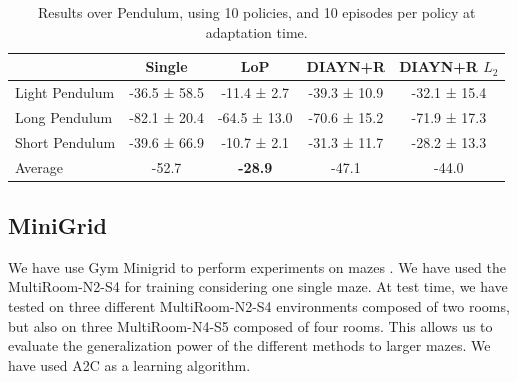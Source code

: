 \begin{table}[h!]
\begin{center}
    \begin{tabular}{l|c|c|c|c} \toprule
    &	Single	& LoP &	DIAYN+R& 	DIAYN+R $L_2$	\\ \hline
    
    Light Pendulum	&	-36.5 ± 58.5	& -11.4 ± 2.7	& -39.3 ± 10.9	& -32.1 ± 15.4	\\
Long Pendulum	&	-82.1 ± 20.4	& -64.5 ± 13.0	& -70.6 ± 15.2	& -71.9 ± 17.3	\\
Short Pendulum	&	-39.6 ± 66.9	& -10.7 ± 2.1	& -31.3 ± 11.7	& -28.2 ± 13.3	\\ \hline
Average	&	-52.7	& \textbf{-28.9}	& -47.1	& -44.0	\\
\hline
\end{tabular}
\caption{Results over Pendulum, using 10 policies, and 10 episodes per policy at adaptation time. }
\end{center}
\end{table}
\newpage
\subsection{MiniGrid}
\label{subsec:minigrid}

We have use Gym Minigrid to perform experiments on mazes \cite{gym_minigrid}. We have used the MultiRoom-N2-S4 for training considering one single maze. At test time, we have tested on three different MultiRoom-N2-S4 environments  composed of two rooms, but also on three MultiRoom-N4-S5  composed of four rooms. This allows us to evaluate the generalization power of the different methods to larger mazes. We have used A2C as a learning algorithm.


